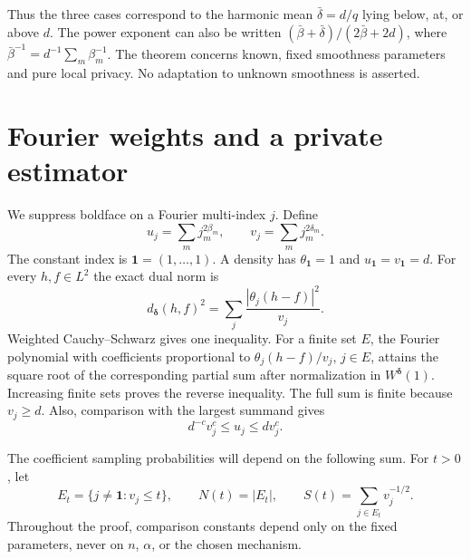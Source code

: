 \documentclass[11pt]{article}
\newcommand{\one}{\mathbf 1}
\begin{document}
Thus the three cases correspond to the harmonic mean
$\bar\delta=d/q$ lying below, at, or above $d$. The power exponent can also
be written $(\bar\beta+\bar\delta)/(2\bar\beta+2d)$, where
$\bar\beta^{-1}=d^{-1}\sum_m\beta_m^{-1}$.
The theorem concerns known, fixed smoothness parameters and pure local
privacy. No adaptation to unknown smoothness is asserted.

\section{Fourier weights and a private estimator}

We suppress boldface on a Fourier multi-index $j$. Define
\[
 u_j=\sum_m j_m^{2\beta_m},\qquad v_j=\sum_m j_m^{2\delta_m}.
\]
The constant index is $\one=(1,\ldots,1)$. A density has
$\theta_{\one}=1$ and $u_{\one}=v_{\one}=d$.
For every $h,f\in L^2$ the exact dual norm is
\begin{equation}\label{eq:dual}
 d_{\boldsymbol\delta}(h,f)^2
 =\sum_j\frac{|\theta_j(h-f)|^2}{v_j}.
\end{equation}
Weighted Cauchy--Schwarz gives one inequality. For a finite set $E$, the
Fourier polynomial with coefficients proportional to
$\theta_j(h-f)/v_j$, $j\in E$, attains the square root of the corresponding
partial sum after normalization in $W^{\boldsymbol\delta}(1)$.
Increasing finite sets proves the reverse inequality. The full sum is finite
because $v_j\ge d$. Also, comparison with the largest summand gives
\begin{equation}\label{eq:weights}
 d^{-c}v_j^c\le u_j\le d v_j^c.
\end{equation}

The coefficient sampling probabilities will depend on the following sum.
For $t>0$, let
\[
 E_t=\{j\ne\one:v_j\le t\},\qquad
 N(t)=|E_t|,\qquad S(t)=\sum_{j\in E_t}v_j^{-1/2}.
\]
Throughout the proof, comparison constants depend only on the fixed
parameters, never on $n$, $\alpha$, or the chosen mechanism.
\end{document}
